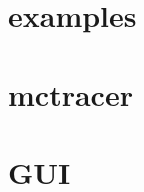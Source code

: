 \documentclass{article}
\begin{document}
\section{examples} 
\section{mctracer} 
\section{GUI} 
\end{document}
